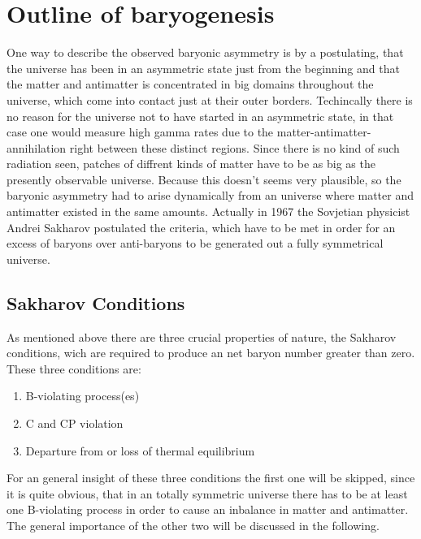\section{Outline of baryogenesis}
One way to describe the observed baryonic asymmetry is by a postulating, that the universe has been in an asymmetric state just from the beginning and that the matter and antimatter is concentrated in big domains throughout the universe, which come into contact just at their outer borders. Techincally there is no reason for the universe not to have started in an asymmetric state, in that case one would measure high gamma rates due to the matter-antimatter-annihilation right between these distinct regions. \newline
Since there is no kind of such radiation seen, patches of diffrent kinds of matter have to be as big as the presently observable universe. Because this doesn't seems very plausible, so the baryonic asymmetry had to arise dynamically from an universe where matter and antimatter existed in the same amounts. \newline
Actually in 1967 the Sovjetian physicist Andrei Sakharov postulated the criteria, which have to be met in order for an excess of baryons over anti-baryons to be generated out a fully symmetrical universe.
\subsection{Sakharov Conditions}
As mentioned above there are three crucial properties of nature, the Sakharov conditions, wich are required to produce an net baryon number greater than zero. These three conditions are:
\begin{enumerate}
	\item B-violating process(es)
	\item C and CP violation
	\item Departure from or loss of thermal equilibrium
\end{enumerate}
For an general insight of these three conditions the first one will be skipped, since it is quite obvious, that in an totally symmetric universe there has to be at least one B-violating process in order to cause an inbalance in matter and antimatter. \newline
The general importance of the other two will be discussed in the following.
